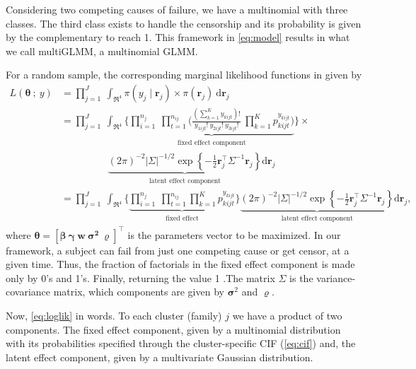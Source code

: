 Considering two competing causes of failure, we have a multinomial with
three classes. The third class exists to handle the censorship and its
probability is given by the complementary to reach 1. This framework in
\autoref{eq:model} results in what we call multiGLMM, a multinomial
GLMM.

For a random sample, the corresponding marginal likelihood functions in
given by
\begin{align}
  L(\bm{\theta}~;~y)
  &= \prod_{j=1}^{J}~\int_{\Re^{4}}
    \pi(y_{j} \mid \bm{r}_{j})\times\pi(\bm{r}_{j})~\text{d}\bm{r}_{j}
    \nonumber\\
  &= \prod_{j=1}^{J}~\int_{\Re^{4}}
    \Bigg\{
    \underbrace{\prod_{i=1}^{n_{j}}~\prod_{t=1}^{n_{ij}}
    \Bigg(
    \frac{(\sum_{k=1}^{K}y_{kijt})!}{y_{1ijt}!~y_{2ijt}!~y_{3ijt}!}~
    \prod_{k=1}^{K} p_{kijt}^{y_{kijt}}
    \Bigg)}_{\substack{\text{fixed effect component}}}
  \Bigg\}\times\nonumber\\
  &\hspace{2cm}\underbrace{
    (2\pi)^{-2} |\Sigma|^{-1/2} \exp
    \left\{-\frac{1}{2}\bm{r}_{j}^{\top} \Sigma^{-1} \bm{r}_{j}\right\}
    }_{\substack{\text{latent effect component}}}
    \text{d}\bm{r}_{j}\nonumber\\
  &= \prod_{j=1}^{J}~\int_{\Re^{4}}
    \Bigg\{
    \underbrace{\prod_{i=1}^{n_{j}}~\prod_{t=1}^{n_{ij}}
    \prod_{k=1}^{K} p_{kijt}^{y_{kijt}}
    }_{\substack{\text{fixed effect}}}
  \Bigg\}\underbrace{
  (2\pi)^{-2} |\Sigma|^{-1/2} \exp
  \left\{-\frac{1}{2}\bm{r}_{j}^{\top} \Sigma^{-1} \bm{r}_{j}\right\}
  }_{\substack{\text{latent effect component}}}
  \text{d}\bm{r}_{j}\label{eq:loglik},
\end{align}
where \(\bm{\theta} = [\bm{\beta}~\bm{\gamma}~\bm{w}~\bm{\sigma^{2}}~
\bm{\varrho}]^{\top}\) is the parameters vector to be maximized. In our
framework, a subject can fail from just one competing cause or get
censor, at a given time. Thus, the fraction of factorials in the fixed
effect component is made only by 0's and 1's. Finally, returning the
value 1 .The matrix \(\Sigma\) is the variance-covariance matrix, which
components are given by \(\bm{\sigma}^{2}\) and \(\bm{\varrho}\).

Now, \autoref{eq:loglik} in words. To each cluster (family) \(j\) we
have a product of two components. The fixed effect component, given by a
multinomial distribution with its probabilities specified through the
cluster-specific CIF (\autoref{eq:cif}) and, the latent effect
component, given by a multivariate Gaussian distribution.

